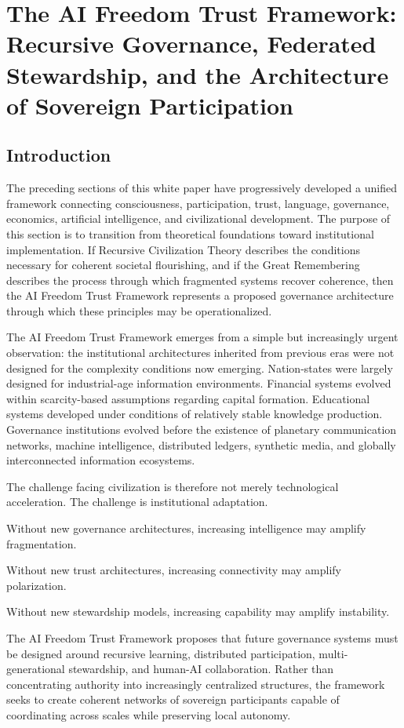 \documentclass[12pt]{article}
\begin{document}
\section{The AI Freedom Trust Framework: Recursive Governance, Federated Stewardship, and the Architecture of Sovereign Participation}

\subsection{Introduction}

The preceding sections of this white paper have progressively developed a unified framework connecting consciousness, participation, trust, language, governance, economics, artificial intelligence, and civilizational development. The purpose of this section is to transition from theoretical foundations toward institutional implementation. If Recursive Civilization Theory describes the conditions necessary for coherent societal flourishing, and if the Great Remembering describes the process through which fragmented systems recover coherence, then the AI Freedom Trust Framework represents a proposed governance architecture through which these principles may be operationalized.

The AI Freedom Trust Framework emerges from a simple but increasingly urgent observation: the institutional architectures inherited from previous eras were not designed for the complexity conditions now emerging. Nation-states were largely designed for industrial-age information environments. Financial systems evolved within scarcity-based assumptions regarding capital formation. Educational systems developed under conditions of relatively stable knowledge production. Governance institutions evolved before the existence of planetary communication networks, machine intelligence, distributed ledgers, synthetic media, and globally interconnected information ecosystems.

The challenge facing civilization is therefore not merely technological acceleration. The challenge is institutional adaptation.

Without new governance architectures, increasing intelligence may amplify fragmentation.

Without new trust architectures, increasing connectivity may amplify polarization.

Without new stewardship models, increasing capability may amplify instability.

The AI Freedom Trust Framework proposes that future governance systems must be designed around recursive learning, distributed participation, multi-generational stewardship, and human-AI collaboration. Rather than concentrating authority into increasingly centralized structures, the framework seeks to create coherent networks of sovereign participants capable of coordinating across scales while preserving local autonomy.
\end{document}
